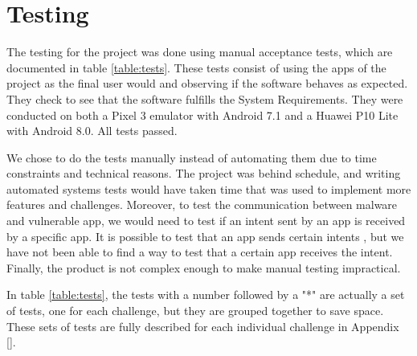     \section{Testing}
        \label{sec:testing}
        
    The testing for the project was done using manual acceptance tests, which are documented in table \ref{table:tests}. These tests consist of using the apps of the project as the final user would and observing if the software behaves as expected. They check to see that the software fulfills the System Requirements. They were conducted on both a Pixel 3 emulator with Android 7.1 and a Huawei P10 Lite with Android 8.0. All tests passed.
    
    We chose to do the tests manually instead of automating them due to time constraints and technical reasons. The project was behind schedule, and writing automated systems tests would have taken time that was used to implement more features and challenges. Moreover, to test the communication between malware and vulnerable app, we would need to test if an intent sent by an app is received by a specific app. It is possible to test that an app sends certain intents \cite{testing_intents}, but we have not been able to find a way to test that a certain app receives the intent. Finally, the product is not complex enough to make manual testing impractical.
    
    In table \ref{table:tests}, the tests with a number followed by a "*" are actually a set of tests, one for each challenge, but they are grouped together to save space. These sets of tests are fully described for each individual challenge in Appendix \ref{}.
    
